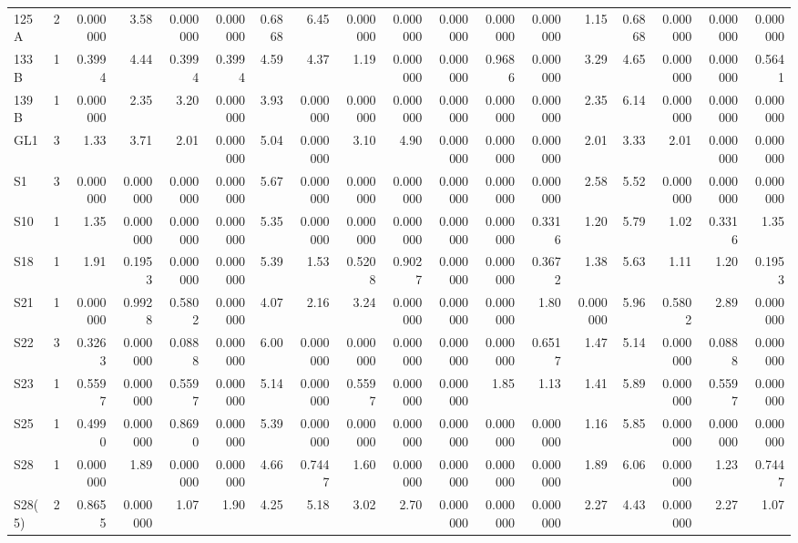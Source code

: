 {\begin{longtable}{lrrrrrrrrrrrrrrrrr}
  125A & 2 & 0.000000 & 3.58 & 0.000000 & 0.000000 & 0.6868 & 6.45 & 0.000000 & 0.000000 & 0.000000 & 0.000000 & 0.000000 & 1.15 & 0.6868 & 0.000000 & 0.000000 & 0.000000 \\
  133B & 1 & 0.3994 & 4.44 & 0.3994 & 0.3994 & 4.59 & 4.37 & 1.19 & 0.000000 & 0.000000 & 0.9686 & 0.000000 & 3.29 & 4.65 & 0.000000 & 0.000000 & 0.5641 \\
  139B & 1 & 0.000000 & 2.35 & 3.20 & 0.000000 & 3.93 & 0.000000 & 0.000000 & 0.000000 & 0.000000 & 0.000000 & 0.000000 & 2.35 & 6.14 & 0.000000 & 0.000000 & 0.000000 \\
  GL1 & 3 & 1.33 & 3.71 & 2.01 & 0.000000 & 5.04 & 0.000000 & 3.10 & 4.90 & 0.000000 & 0.000000 & 0.000000 & 2.01 & 3.33 & 2.01 & 0.000000 & 0.000000 \\
  S1 & 3 & 0.000000 & 0.000000 & 0.000000 & 0.000000 & 5.67 & 0.000000 & 0.000000 & 0.000000 & 0.000000 & 0.000000 & 0.000000 & 2.58 & 5.52 & 0.000000 & 0.000000 & 0.000000 \\
  S10 & 1 & 1.35 & 0.000000 & 0.000000 & 0.000000 & 5.35 & 0.000000 & 0.000000 & 0.000000 & 0.000000 & 0.000000 & 0.3316 & 1.20 & 5.79 & 1.02 & 0.3316 & 1.35 \\
  S18 & 1 & 1.91 & 0.1953 & 0.000000 & 0.000000 & 5.39 & 1.53 & 0.5208 & 0.9027 & 0.000000 & 0.000000 & 0.3672 & 1.38 & 5.63 & 1.11 & 1.20 & 0.1953 \\
  S21 & 1 & 0.000000 & 0.9928 & 0.5802 & 0.000000 & 4.07 & 2.16 & 3.24 & 0.000000 & 0.000000 & 0.000000 & 1.80 & 0.000000 & 5.96 & 0.5802 & 2.89 & 0.000000 \\
  S22 & 3 & 0.3263 & 0.000000 & 0.0888 & 0.000000 & 6.00 & 0.000000 & 0.000000 & 0.000000 & 0.000000 & 0.000000 & 0.6517 & 1.47 & 5.14 & 0.000000 & 0.0888 & 0.000000 \\
  S23 & 1 & 0.5597 & 0.000000 & 0.5597 & 0.000000 & 5.14 & 0.000000 & 0.5597 & 0.000000 & 0.000000 & 1.85 & 1.13 & 1.41 & 5.89 & 0.000000 & 0.5597 & 0.000000 \\
  S25 & 1 & 0.4990 & 0.000000 & 0.8690 & 0.000000 & 5.39 & 0.000000 & 0.000000 & 0.000000 & 0.000000 & 0.000000 & 0.000000 & 1.16 & 5.85 & 0.000000 & 0.000000 & 0.000000 \\
  S28 & 1 & 0.000000 & 1.89 & 0.000000 & 0.000000 & 4.66 & 0.7447 & 1.60 & 0.000000 & 0.000000 & 0.000000 & 0.000000 & 1.89 & 6.06 & 0.000000 & 1.23 & 0.7447 \\
  S28(5) & 2 & 0.8655 & 0.000000 & 1.07 & 1.90 & 4.25 & 5.18 & 3.02 & 2.70 & 0.000000 & 0.000000 & 0.000000 & 2.27 & 4.43 & 0.000000 & 2.27 & 1.07 \\

\end{longtable}}

